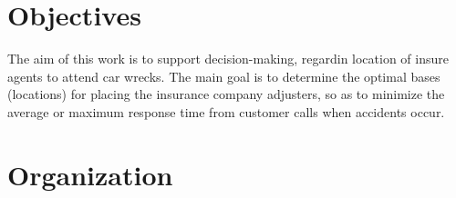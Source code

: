 \section{Objectives}
The aim of this work is to support decision-making,
regardin location of insure agents to attend car wrecks.
The main goal is
to determine the optimal bases (locations)
for placing the insurance company adjusters,
so as to minimize
the average or maximum response time
from customer calls
when accidents occur.

\section{Organization}

